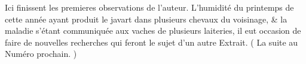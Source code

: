 Ici finissent les premieres observations de l'auteur. L'humidité du printemps de cette année ayant produit le javart dans plusieurs chevaux du voisinage, & la maladie s'étant communiquée aux vaches de plusieurs laiteries, il eut occasion de faire de nouvelles recherches qui feront le sujet d'un autre Extrait.
( La suite au Numéro prochain. )
